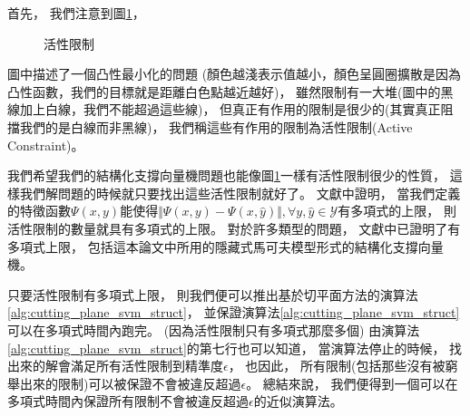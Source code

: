   首先，
  我們注意到圖\ref{fig:active_constraint}，
  \begin{figure}
    \caption{活性限制}
    \label{fig:active_constraint}
  \end{figure}
  圖中描述了一個凸性最小化的問題
  (顏色越淺表示值越小，顏色呈圓圈擴散是因為凸性函數，我們的目標就是距離白色點越近越好)，
  雖然限制有一大堆(圖中的黑線加上白線，我們不能超過這些線)，
  但真正有作用的限制是很少的(其實真正阻擋我們的是白線而非黑線)，
  我們稱這些有作用的限制為活性限制(Active Constraint)。

  我們希望我們的結構化支撐向量機問題也能像圖\ref{fig:active_constraint}一樣有活性限制很少的性質，
  這樣我們解問題的時候就只要找出這些活性限制就好了。
  文獻中\cite{SVMstructJournal}證明，
  當我們定義的特徵函數$\Psi(x,y)$能使得$\Vert \Psi(x,y) - \Psi(x, \hat{y}) \Vert, \forall y, \hat{y} \in \mathcal{Y}$有多項式的上限，
  則活性限制的數量就具有多項式的上限。
  對於許多類型的問題，
  文獻中\cite{SVMstructJournal}已證明了有多項式上限，
  包括這本論文中所用的隱藏式馬可夫模型形式的結構化支撐向量機。

  只要活性限制有多項式上限，
  則我們便可以推出基於切平面方法的演算法\ref{alg:cutting_plane_svm_struct}，
  並保證演算法\ref{alg:cutting_plane_svm_struct}可以在多項式時間內跑完。
  (因為活性限制只有多項式那麼多個)
  由演算法\ref{alg:cutting_plane_svm_struct}的第七行也可以知道，
  當演算法停止的時候，
  找出來的解會滿足所有活性限制到精準度$\epsilon$，
  也因此，
  所有限制(包括那些沒有被窮舉出來的限制)可以被保證不會被違反超過$\epsilon$。
  總結來說，
  我們便得到一個可以在多項式時間內保證所有限制不會被違反超過$\epsilon$的近似演算法。 
  
